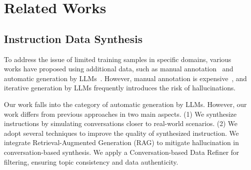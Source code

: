 \section{Related Works}


\subsection{Instruction Data Synthesis}
To address the issue of limited training samples in specific domains, various works have proposed using additional data, such as manual annotation~\cite{Zhao2024WildChat1C,zheng2023lmsys} and automatic generation by LLMs~\cite{Mekala2022LeveragingQD, Wang2021TowardsZL, Wang2022SelfInstructAL, Xu2023WizardLMEL}. However, manual annotation is expensive~\cite{honovich-etal-2023-unnatural}, and iterative generation by LLMs frequently introduces the risk of hallucinations.


Our work falls into the category of automatic generation by LLMs. However, our work differs from previous approaches in two main aspects. (1) We synthesize instructions by simulating conversations closer to real-world scenarios. (2) We adopt several techniques to improve the quality of synthesized instruction. We integrate Retrieval-Augmented Generation (RAG) to mitigate hallucination in conversation-based synthesis. We apply a Conversation-based Data Refiner for filtering, ensuring topic consistency and data authenticity.
